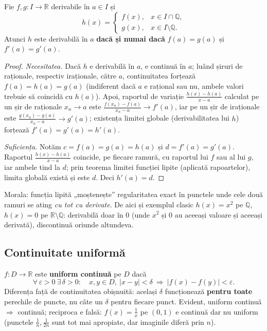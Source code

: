 \begin{propozitie}
Fie $f,g:I\to\mathbb{R}$ derivabile în $a\in I$ și
\[
h(x)=\begin{cases} f(x), & x\in I\cap\mathbb{Q},\\ g(x), & x\in I\setminus\mathbb{Q}.\end{cases}
\]
Atunci $h$ este derivabilă în $a$ \textbf{dacă și numai dacă} $f(a)=g(a)$ și $f'(a)=g'(a)$.
\end{propozitie}
\begin{proof}
\emph{Necesitatea.} Dacă $h$ e derivabilă în $a$, e continuă în $a$; luând șiruri de raționale, respectiv iraționale, către $a$, continuitatea forțează $f(a)=h(a)=g(a)$ (indiferent dacă $a$ e rațional sau nu, ambele valori trebuie să coincidă cu $h(a)$). Apoi, raportul de variație $\frac{h(x)-h(a)}{x-a}$ calculat pe un șir de raționale $x_n\to a$ este $\frac{f(x_n)-f(a)}{x_n-a}\to f'(a)$, iar pe un șir de iraționale este $\frac{g(x_n)-g(a)}{x_n-a}\to g'(a)$; existența limitei globale (derivabilitatea lui $h$) forțează $f'(a)=g'(a)=h'(a)$.

\emph{Suficiența.} Notăm $c=f(a)=g(a)=h(a)$ și $d=f'(a)=g'(a)$. Raportul $\frac{h(x)-h(a)}{x-a}$ coincide, pe fiecare ramură, cu raportul lui $f$ sau al lui $g$, iar ambele tind la $d$; prin teorema limitei funcției lipite (aplicată rapoartelor), limita globală există și este $d$. Deci $h'(a)=d$.
\end{proof}

\begin{obs}
Morala: funcția lipită „moștenește'' regularitatea exact în punctele unde cele două ramuri se ating \emph{cu tot cu derivate}. De aici și exemplul clasic $h(x)=x^2$ pe $\mathbb{Q}$, $h(x)=0$ pe $\mathbb{R}\setminus\mathbb{Q}$: derivabilă doar în $0$ (unde $x^2$ și $0$ au aceeași valoare și aceeași derivată), discontinuă oriunde altundeva.
\end{obs}

\subsection{Continuitate uniformă}

\begin{definitie}
$f:D\to\mathbb{R}$ este \textbf{uniform continuă} pe $D$ dacă
\[
\forall\,\varepsilon>0\ \exists\,\delta>0:\quad x,y\in D,\ |x-y|<\delta\ \Rightarrow\ |f(x)-f(y)|<\varepsilon.
\]
Diferența față de continuitatea obișnuită: același $\delta$ funcționează \textbf{pentru toate} perechile de puncte, nu câte un $\delta$ pentru fiecare punct. Evident, uniform continuă $\Rightarrow$ continuă; reciproca e falsă: $f(x)=\frac1x$ pe $(0,1)$ e continuă dar nu uniform (punctele $\frac1n,\frac1{2n}$ sunt tot mai apropiate, dar imaginile diferă prin $n$).
\end{definitie}


